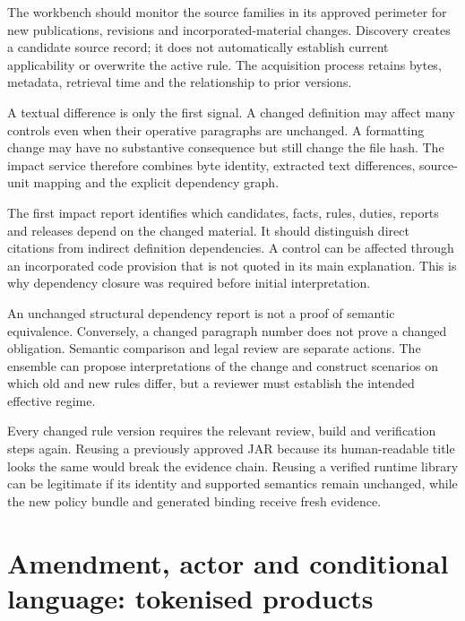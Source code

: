 The workbench should monitor the source families in its approved perimeter for
new publications, revisions and incorporated-material changes. Discovery creates
a candidate source record; it does not automatically establish current
applicability or overwrite the active rule. The acquisition process retains bytes,
metadata, retrieval time and the relationship to prior versions.

A textual difference is only the first signal. A changed definition may affect
many controls even when their operative paragraphs are unchanged. A formatting
change may have no substantive consequence but still change the file hash. The
impact service therefore combines byte identity, extracted text differences,
source-unit mapping and the explicit dependency graph.


The first impact report identifies which candidates, facts, rules, duties,
reports and releases depend on the changed material. It should distinguish direct
citations from indirect definition dependencies. A control can be affected through
an incorporated code provision that is not quoted in its main explanation. This
is why dependency closure was required before initial interpretation.

An unchanged structural dependency report is not a proof of semantic equivalence.
Conversely, a changed paragraph number does not prove a changed obligation.
Semantic comparison and legal review are separate actions. The ensemble can
propose interpretations of the change and construct scenarios on which old and
new rules differ, but a reviewer must establish the intended effective regime.

Every changed rule version requires the relevant review, build and verification
steps again. Reusing a previously approved JAR because its human-readable title
looks the same would break the evidence chain. Reusing a verified runtime library
can be legitimate if its identity and supported semantics remain unchanged, while
the new policy bundle and generated binding receive fresh evidence.

\section{Amendment, actor and conditional language: tokenised products}
\label{merge:P-01-problem:03}


